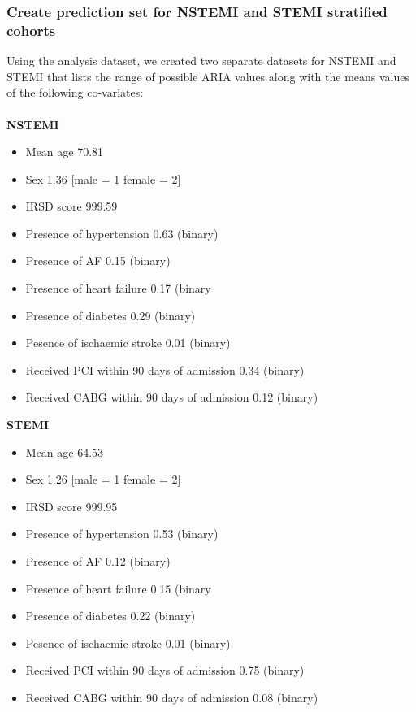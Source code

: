 \documentclass[11pt]{article}
\begin{document}
\subsubsection{Create prediction set for NSTEMI and STEMI stratified cohorts}
Using the analysis dataset, we created two separate datasets for NSTEMI and STEMI that lists the range of possible ARIA values along with the means values of the following co-variates:\\~\\ 
\textbf{NSTEMI}
\begin{itemize}
\item Mean age 70.81
\item Sex 1.36 [male = 1 female = 2]
\item IRSD score 999.59
\item Presence of hypertension 0.63 (binary)
\item Presence of AF 0.15 (binary)
\item Presence of heart failure 0.17 (binary
\item Presence of diabetes 0.29 (binary)
\item Pesence of ischaemic stroke 0.01 (binary)
\item Received PCI within 90 days of admission 0.34 (binary)
\item Received CABG within 90 days of admission 0.12 (binary)
\end{itemize}

\textbf{STEMI}
\begin{itemize}
\item Mean age 64.53
\item Sex 1.26 [male = 1 female = 2]
\item IRSD score 999.95
\item Presence of hypertension 0.53 (binary)
\item Presence of AF 0.12 (binary)
\item Presence of heart failure 0.15 (binary
\item Presence of diabetes 0.22 (binary)
\item Pesence of ischaemic stroke 0.01 (binary)
\item Received PCI within 90 days of admission 0.75 (binary)
\item Received CABG within 90 days of admission 0.08 (binary)
\end{itemize}

\color{violet}
\begin{stlog}\end{stlog}
\color{black}
\end{document}
